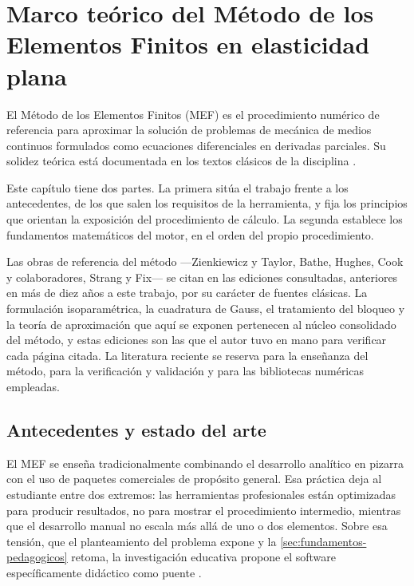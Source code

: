 \chapter{Marco teórico del Método de los Elementos Finitos en elasticidad plana}
\label{cap:marco_teorico}

El Método de los Elementos Finitos (MEF) es el procedimiento numérico de referencia para aproximar la solución de problemas de mecánica de medios continuos formulados como ecuaciones diferenciales en derivadas parciales. Su solidez teórica está documentada en los textos clásicos de la disciplina \autocite{zienkiewicz2013fem,bathe2014fem,cook2002concepts}.

Este capítulo tiene dos partes. La primera sitúa el trabajo frente a los antecedentes, de los que salen los requisitos de la herramienta, y fija los principios que orientan la exposición del procedimiento de cálculo. La segunda establece los fundamentos matemáticos del motor, en el orden del propio procedimiento.

Las obras de referencia del método —Zienkiewicz y Taylor, Bathe, Hughes, Cook y colaboradores, Strang y Fix— se citan en las ediciones consultadas, anteriores en más de diez años a este trabajo, por su carácter de fuentes clásicas. La formulación isoparamétrica, la cuadratura de Gauss, el tratamiento del bloqueo y la teoría de aproximación que aquí se exponen pertenecen al núcleo consolidado del método, y estas ediciones son las que el autor tuvo en mano para verificar cada página citada. La literatura reciente se reserva para la enseñanza del método, para la verificación y validación y para las bibliotecas numéricas empleadas.

\section{Antecedentes y estado del arte}
\label{sec:antecedentes}

El MEF se enseña tradicionalmente combinando el desarrollo analítico en pizarra con el uso de paquetes comerciales de propósito general. Esa práctica deja al estudiante entre dos extremos: las herramientas profesionales están optimizadas para producir resultados, no para mostrar el procedimiento intermedio, mientras que el desarrollo manual no escala más allá de uno o dos elementos. Sobre esa tensión, que el planteamiento del problema expone y la \autoref{sec:fundamentos-pedagogicos} retoma, la investigación educativa propone el software específicamente didáctico como puente \autocite{bishay2020teaching,lee2015interactive,perezsantiago2023fem}.

